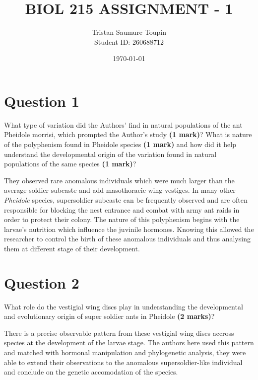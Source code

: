 \documentclass[letterpaper,12pt]{article}
\newenvironment{myindentpar}[1]%
{\begin{list}{}%
          {\setlength{\leftmargin}{#1}}%
          \item[]%
}
{\end{list}}
\begin{document}
\title{BIOL 215 ASSIGNMENT - 1}
\author{Tristan Saumure Toupin \\ Student ID: 260688712}
\date{\today}
\maketitle


\section*{Question 1}

What type of variation did the Authors’ find in natural populations of the ant Pheidole morrisi, which prompted the Author’s study \textbf{(1 mark)}? What is nature of the polyphenism found in Pheidole species \textbf{(1 mark)} and how did it help understand the developmental origin of the variation found in natural populations of the same species \textbf{(1 mark)}?
\vspace*{10px}

\begin{myindentpar}{0.5cm}
They observed rare anomalous individuals which were much larger than the average soldier subcaste and add masothoracic wing vestiges. In many other \textit{Pheidole} species, supersoldier subcaste can be frequently observed and are often responsible for blocking the nest entrance and combat with army ant raids in order to protect their colony. The nature of this polyphenism begins with the larvae's nutrition which influence the juvinile hormones. Knowing this allowed the researcher to control the birth of these anomalous individuals and thus analysing them at different stage of their development.
\end{myindentpar}



\section*{Question 2}

What role do the vestigial wing discs play in understanding the developmental and evolutionary origin of super soldier ants in Pheidole \textbf{(2 marks)}?
\vspace*{10px}

\begin{myindentpar}{0.5cm}
There is a precise observable pattern from these vestigial wing discs accross species at the development of the larvae stage. The authors here used this pattern and matched with hormonal manipulation and phylogenetic analysis, they were able to extend their observations to the anomalous supersoldier-like individual and conclude on the genetic accomodation of the species.
\end{myindentpar}
\end{document}
